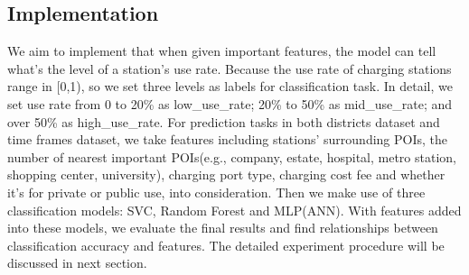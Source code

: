 \subsection{Implementation}
We aim to implement that when given important features, the model can tell what's the level of a station's use rate. Because the use rate of charging stations range in [0,1), so we set three levels as labels for classification task. In detail, we set use rate from 0 to 20\% as low\_use\_rate; 20\% to 50\% as mid\_use\_rate; and over 50\% as high\_use\_rate. For prediction tasks in both districts dataset and time frames dataset, we take features including stations' surrounding POIs, the number of nearest important POIs(e.g., company, estate, hospital, metro station, shopping center, university), charging port type, charging cost fee and whether it's for private or public use, into consideration. Then we make use of three classification models: SVC, Random Forest and MLP(ANN). With features added into these models, we evaluate the final results and find relationships between classification accuracy and features. The detailed experiment procedure will be discussed in next section.
